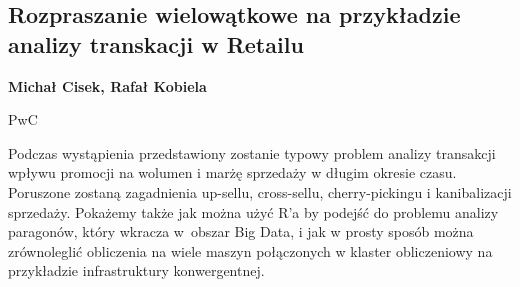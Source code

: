\documentclass[\main/boa.tex]{subfiles}
\begin{document}
\subsection{Rozpraszanie wielowątkowe na przykładzie analizy transkacji w Retailu}

\begin{minipage}{0.915\textwidth}
	\centering
  {\bf {} Michał Cisek,  Rafał Kobiela}
\end{minipage}


\begin{affiliations}
\begin{minipage}{0.915\textwidth}
\centering
PwC \\[-2pt]
\end{minipage}
\end{affiliations}

\vskip 0.3cm

 Podczas wystąpienia przedstawiony zostanie typowy problem analizy transakcji wpływu promocji na wolumen i marżę sprzedaży w długim okresie czasu. Poruszone zostaną zagadnienia up-sellu, cross-sellu, cherry-pickingu i kanibalizacji sprzedaży. Pokażemy także jak można użyć R'a by podejść do problemu analizy paragonów, który wkracza w~obszar Big Data, i jak w prosty sposób można zrównoleglić obliczenia na wiele maszyn połączonych w klaster obliczeniowy na przykładzie infrastruktury konwergentnej. 
\end{document}
